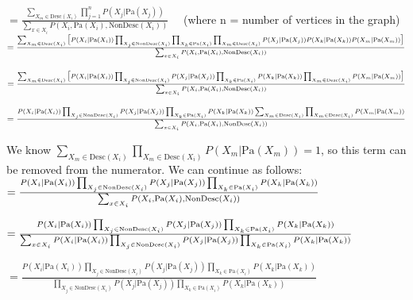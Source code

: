 \documentclass[12pt]{article}
\begin{document}
$= \frac{\sum_{X_m \in \text{Desc}(X_i)}\prod_{j=1}^{n} P(X_j \vert \text{Pa}(X_j))}{\sum_{x \in X_i} P(X_i, \text{Pa}(X_i), \text{NonDesc}(X_i))}\quad$ (where n = number of vertices in the graph) \\

$= \frac{\sum_{X_m \in \text{Desc}(X_i)} \big[P(X_i \vert \text{Pa}(X_i))\prod_{X_j \in \text{NonDesc}(X_i)}\prod_{X_k \in \text{Pa}(X_i)} \prod_{X_m \in \text{Desc}(X_i)} P(X_j \vert \text{Pa}(X_j)) P(X_k \vert \text{Pa}(X_k)) P(X_m \vert \text{Pa}(X_m))\big]}{\sum_{x \in X_i} P(X_i, \text{Pa}(X_i), \text{NonDesc}(X_i))}\\$

$= \frac{\sum_{X_m \in \text{Desc}(X_i)} \big[P(X_i \vert \text{Pa}(X_i))\prod_{X_j \in \text{NonDesc}(X_i)} P(X_j \vert \text{Pa}(X_j))\prod_{X_k \in \text{Pa}(X_i)} P(X_k \vert \text{Pa}(X_k))\prod_{X_m \in \text{Desc}(X_i)} P(X_m \vert \text{Pa}(X_m))\big]}{\sum_{x \in X_i} P(X_i, \text{Pa}(X_i), \text{NonDesc}(X_i))}\\$

$= \frac{P(X_i \vert \text{Pa}(X_i))\prod_{X_j \in \text{NonDesc}(X_i)} P(X_j \vert \text{Pa}(X_j))\prod_{X_k \in \text{Pa}(X_i)} P(X_k \vert \text{Pa}(X_k))\sum_{X_m \in \text{Desc}(X_i)}\prod_{X_m \in \text{Desc}(X_i)} P(X_m \vert \text{Pa}(X_m))}{\sum_{x \in X_i} P(X_i, \text{Pa}(X_i), \text{NonDesc}(X_i))}\\$

We know $\sum_{X_m \in \text{Desc}(X_i)}\prod_{X_m \in \text{Desc}(X_i)} P(X_m \vert \text{Pa}(X_m)) = 1$, so this term can be removed from the numerator. We can continue as follows:\\

$= \frac{P(X_i \vert \text{Pa}(X_i))\prod_{X_j \in \text{NonDesc}(X_i)} P(X_j \vert \text{Pa}(X_j))\prod_{X_k \in \text{Pa}(X_i)} P(X_k \vert \text{Pa}(X_k))}{\sum_{x \in X_i} P(X_i, \text{Pa}(X_i), \text{NonDesc}(X_i))}\\$

$= \frac{P(X_i \vert \text{Pa}(X_i))\prod_{X_j \in \text{NonDesc}(X_i)} P(X_j \vert \text{Pa}(X_j))\prod_{X_k \in \text{Pa}(X_i)} P(X_k \vert \text{Pa}(X_k))}{\sum_{x \in X_i} P(X_i \vert \text{Pa}(X_i)) \prod_{X_j \in \text{NonDesc}(X_i)} P(X_j \vert \text{Pa}(X_j)) \prod_{X_k \in \text{Pa}(X_i)} P(X_k \vert \text{Pa}(X_k))}\\$

$= \frac{P(X_i \vert \text{Pa}(X_i))\prod_{X_j \in \text{NonDesc}(X_i)} P(X_j \vert \text{Pa}(X_j))\prod_{X_k \in \text{Pa}(X_i)} P(X_k \vert \text{Pa}(X_k))}{\prod_{X_j \in \text{NonDesc}(X_i)} P(X_j \vert \text{Pa}(X_j)) \prod_{X_k \in \text{Pa}(X_i)} P(X_k \vert \text{Pa}(X_k))}\quad$\\
\end{document}
